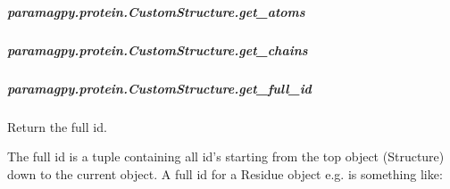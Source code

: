 \documentclass[a4paper,10pt,english,openany,oneside]{sphinxmanual}
\begin{document}
\begin{fulllineitems}
\begin{fulllineitems}
\subparagraph{paramagpy.protein.CustomStructure.get\_atoms}
\label{\detokenize{reference/generated/paramagpy.protein.CustomStructure.get_atoms:paramagpy-protein-customstructure-get-atoms}}\label{\detokenize{reference/generated/paramagpy.protein.CustomStructure.get_atoms::doc}}

\begin{fulllineitems}
\label{\detokenize{reference/generated/paramagpy.protein.CustomStructure.get_atoms:paramagpy.protein.CustomStructure.get_atoms}}
\end{fulllineitems}



\subparagraph{paramagpy.protein.CustomStructure.get\_chains}
\label{\detokenize{reference/generated/paramagpy.protein.CustomStructure.get_chains:paramagpy-protein-customstructure-get-chains}}\label{\detokenize{reference/generated/paramagpy.protein.CustomStructure.get_chains::doc}}

\begin{fulllineitems}
\label{\detokenize{reference/generated/paramagpy.protein.CustomStructure.get_chains:paramagpy.protein.CustomStructure.get_chains}}
\end{fulllineitems}



\subparagraph{paramagpy.protein.CustomStructure.get\_full\_id}
\label{\detokenize{reference/generated/paramagpy.protein.CustomStructure.get_full_id:paramagpy-protein-customstructure-get-full-id}}\label{\detokenize{reference/generated/paramagpy.protein.CustomStructure.get_full_id::doc}}

\begin{fulllineitems}
\label{\detokenize{reference/generated/paramagpy.protein.CustomStructure.get_full_id:paramagpy.protein.CustomStructure.get_full_id}}
Return the full id.

The full id is a tuple containing all id’s starting from
the top object (Structure) down to the current object. A full id for
a Residue object e.g. is something like:


\end{fulllineitems}
\end{fulllineitems}
\end{fulllineitems}
\end{document}

